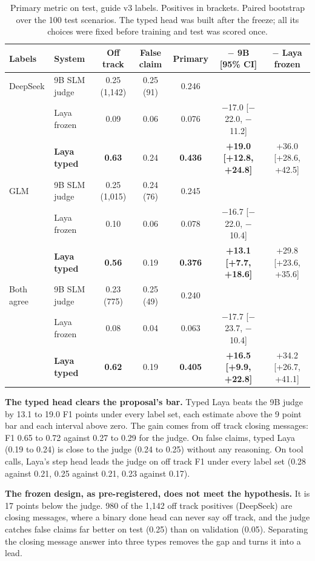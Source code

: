 \documentclass[10pt,a4paper]{article}
\newcommand{\tablestyle}{\footnotesize\rowcolors{2}{rowshade}{white}}
\newcommand{\m}{$-$}
\begin{document}
\begin{table}[H]
\centering\tablestyle
\caption{Primary metric on test, guide v3 labels. Positives in brackets. Paired bootstrap over the 100 test scenarios. The typed head was built after the freeze; all its choices were fixed before training and test was scored once.}\label{tab:primary}
\begin{tabularx}{\linewidth}{lYccccc}
\toprule
\textbf{Labels} & \textbf{System} & \textbf{Off track} & \textbf{False claim} & \textbf{Primary} & \textbf{$-$ 9B [95\% CI]} & \textbf{$-$ Laya frozen} \\
\midrule
DeepSeek & 9B SLM judge & 0.25 (1,142) & 0.25 (91) & 0.246 & & \\
 & Laya frozen & 0.09 & 0.06 & 0.076 & \m17.0 [\m22.0, \m11.2] & \\
 & \textbf{Laya typed} & \textbf{0.63} & 0.24 & \textbf{0.436} & \textbf{+19.0 [+12.8, +24.8]} & +36.0 [+28.6, +42.5] \\
GLM & 9B SLM judge & 0.25 (1,015) & 0.24 (76) & 0.245 & & \\
 & Laya frozen & 0.10 & 0.06 & 0.078 & \m16.7 [\m22.0, \m10.4] & \\
 & \textbf{Laya typed} & \textbf{0.56} & 0.19 & \textbf{0.376} & \textbf{+13.1 [+7.7, +18.6]} & +29.8 [+23.6, +35.6] \\
Both agree & 9B SLM judge & 0.23 (775) & 0.25 (49) & 0.240 & & \\
 & Laya frozen & 0.08 & 0.04 & 0.063 & \m17.7 [\m23.7, \m10.4] & \\
 & \textbf{Laya typed} & \textbf{0.62} & 0.19 & \textbf{0.405} & \textbf{+16.5 [+9.9, +22.8]} & +34.2 [+26.7, +41.1] \\
\bottomrule
\end{tabularx}
\end{table}

\textbf{The typed head clears the proposal's bar.} Typed Laya beats the 9B judge by 13.1 to 19.0 F1 points under every label set, each estimate above the 9 point bar and each interval above zero. The gain comes from off track closing messages: F1 0.65 to 0.72 against 0.27 to 0.29 for the judge. On false claims, typed Laya (0.19 to 0.24) is close to the judge (0.24 to 0.25) without any reasoning. On tool calls, Laya's step head leads the judge on off track F1 under every label set (0.28 against 0.21, 0.25 against 0.21, 0.23 against 0.17).

\textbf{The frozen design, as pre-registered, does not meet the hypothesis.} It is 17 points below the judge. 980 of the 1,142 off track positives (DeepSeek) are closing messages, where a binary done head can never say off track, and the judge catches false claims far better on test (0.25) than on validation (0.05). Separating the closing message answer into three types removes the gap and turns it into a lead.
\end{document}
